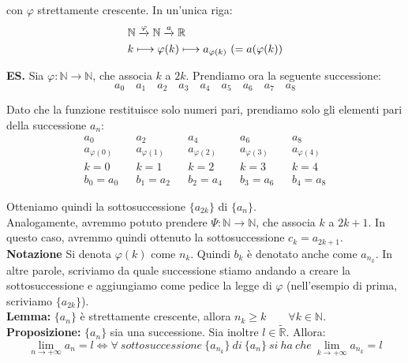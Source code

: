 \documentclass{article}
\begin{document}
\noindent con $\varphi$ strettamente crescente. In un'unica riga:
\begin{align*}
    & \mathbb{N} \overset{\varphi}{\xrightarrow{}} \mathbb{N} \xrightarrow{\mathrlap{a}\ } \mathbb{R} \\
    & k \longmapsto  \varphi(k) \longmapsto a_{\varphi(k)} \ (= a(\varphi(k))
\end{align*}

\noindent\textbf{ES.} Sia $\varphi: \mathbb{N} \xrightarrow{} \mathbb{N}$, che associa $k$ a $2k$. Prendiamo ora la seguente successione:
\begin{equation*}
    a_0 \quad a_1 \quad a_2 \quad a_3 \quad a_4 \quad a_5 \quad a_6 \quad a_7 \quad a_8
\end{equation*}

\noindent Dato che la funzione restituisce solo numeri pari, prendiamo solo gli elementi pari della successione $a_n$:
\begin{align*}
    & a_0 && a_2 && a_4 && a_6 && a_8 & \\
    & a_{\varphi(0)} && a_{\varphi(1)} && a_{\varphi(2)} && a_{\varphi(3)} && a_{\varphi(4)} \\
    & k = 0 && k = 1 && k = 2 && k = 3 && k = 4 \\
    & b_0 = a_0  && b_1 = a_2 && b_2 = a_4 && b_3 = a_6 && b_4 = a_8
\end{align*}

\noindent Otteniamo quindi la sottosuccessione $\{a_{2k}\}$ di $\{a_n\}$.\\

\noindent Analogamente, avremmo potuto prendere $\Psi: \mathbb{N} \xrightarrow{} \mathbb{N}$, che associa $k$ a $2k + 1$. In questo caso, avremmo quindi ottenuto la sottosuccessione $c_k = a_{2k + 1}$.\\

\noindent\textbf{Notazione} Si denota $\varphi(k)$ come $n_k$. Quindi $b_k$ è denotato anche come $a_{n_k}$. In altre parole, scriviamo da quale successione stiamo andando a creare la sottosuccessione e aggiungiamo come pedice la legge di $\varphi$ (nell'esempio di prima, scriviamo $\{a_{2k}\}$).\\

\noindent\textbf{Lemma:} $\{a_n\}$ è strettamente crescente, allora $n_k \geq k \qquad \forall k \in \mathbb{N}$.\\

\noindent\textbf{Proposizione:} $\{a_n\}$ sia una successione. Sia inoltre $l \in \widetilde{\mathbb{R}}$. Allora:
\begin{equation*}
    \lim_{n \to +\infty} a_n = l \iff \forall \ sottosuccessione \ \{a_{n_k}\} \ di \ \{a_n\} \ si \ ha \ che \ \lim_{k \to +\infty} a_{n_k} = l
\end{equation*}
\end{document}
